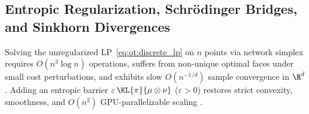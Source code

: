 \documentclass[../../../../master.tex]{subfiles}
\begin{document}
\subsection{Entropic Regularization, Schr\"odinger Bridges, and Sinkhorn Divergences}
\label{sec:ot:entropic_sinkhorn}

Solving the unregularized LP~\eqref{eq:ot:discrete_lp} on $n$ points via network simplex requires $O(n^3 \log n)$ operations, suffers from non-unique optimal faces under small cost perturbations, and exhibits slow $O(n^{-1/d})$ sample convergence in $\R^d$   . Adding an entropic barrier $\varepsilon\,\KL{\pi}{\mu \otimes \nu}$ ($\varepsilon > 0$) restores strict convexity, smoothness, and $O(n^2)$ GPU-parallelizable scaling .
\end{document}
